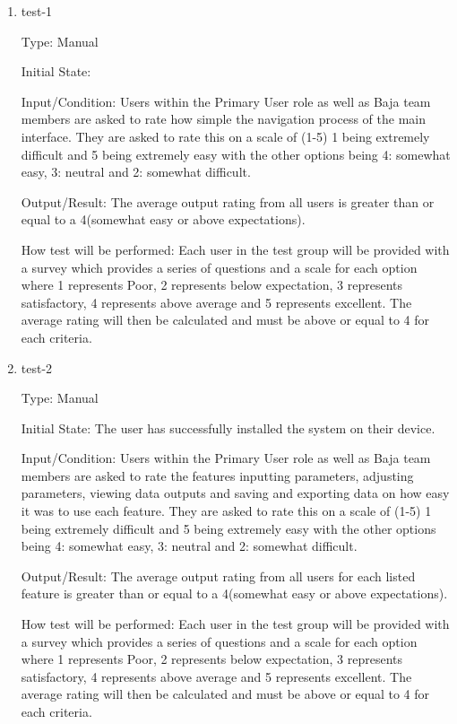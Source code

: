 \documentclass[12pt, titlepage]{article}
\begin{document}
\begin{enumerate}

\item{test-1\\}

Type: Manual
					
Initial State: 
					
Input/Condition: Users within the Primary User role as well as Baja team members are asked to rate how simple the navigation process of the main interface. 
They are asked to rate this on a scale of (1-5) 1 being extremely difficult and 5 being extremely easy with the other options being 4: somewhat easy, 3: neutral and 2: somewhat difficult. 
					
Output/Result: The average output rating from all users is greater than or equal to a 4(somewhat easy or above expectations).
					
How test will be performed: Each user in the test group will be provided with a survey which provides a series of questions and a scale for each option where 1 represents Poor, 2 represents below expectation, 3 represents satisfactory, 4 represents above average and 5 represents excellent.
The average rating will then be calculated and must be above or equal to 4 for each criteria.  

\item{test-2\\}
  
Type: Manual
            
Initial State: The user has successfully installed the system on their device.
            
Input/Condition: Users within the Primary User role as well as Baja team members are asked to rate the features inputting parameters, adjusting parameters, viewing data outputs and saving and exporting data on how easy it was to use each feature.
They are asked to rate this on a scale of (1-5) 1 being extremely difficult and 5 being extremely easy with the other options being 4: somewhat easy, 3: neutral and 2: somewhat difficult. 
            
Output/Result: The average output rating from all users for each listed feature is greater than or equal to a 4(somewhat easy or above expectations).
            
How test will be performed: Each user in the test group will be provided with a survey which provides a series of questions and a scale for each option where 1 represents Poor, 2 represents below expectation, 3 represents satisfactory, 4 represents above average and 5 represents excellent.
The average rating will then be calculated and must be above or equal to 4 for each criteria.  
  
\end{enumerate}
\end{document}
